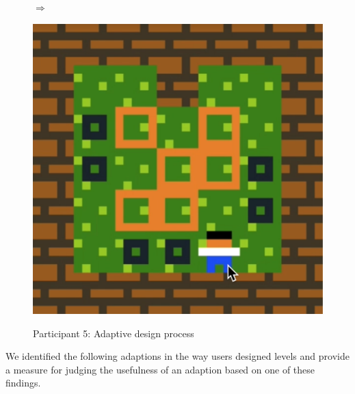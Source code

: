 \begin{figure}[!htbp]
\begin{minipage}[t]{0.25\textwidth}
\end{minipage}
$\Longrightarrow$
\begin{minipage}[t]{0.25\textwidth}
\includegraphics[width=\textwidth]{figures/part5i5.png} \hfill \\
\end{minipage}
\caption{Participant 5: Adaptive design process}
\end{figure}


We identified the following adaptions in the way users designed levels and provide a measure for judging the usefulness of an adaption based on one of these findings.









